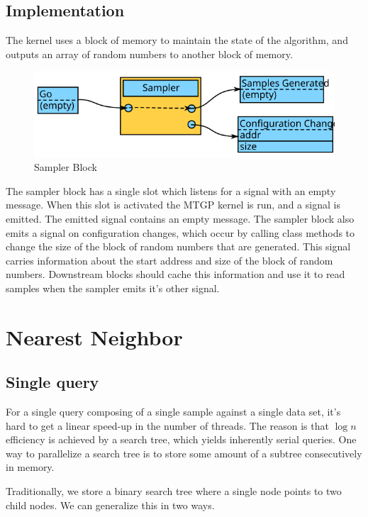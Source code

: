 \subsection{Implementation}

The kernel uses a block of memory to maintain the state of the algorithm, and outputs an array of random numbers to another block of memory. 

\begin{figure}[H]
\begin{centering}
    \includegraphics[scale=1]{fig/blocks/sampler}
    \caption{Sampler Block}
\end{centering}
\end{figure}

The sampler block has a single slot which listens for a signal with an empty message. When this slot is activated the MTGP kernel is run, and a signal is emitted. The emitted signal contains an empty message. The sampler block also emits a signal on configuration changes, which occur by calling class methods to change the size of the block of random numbers that are generated. This signal carries information about the start address and size of the block of random numbers. Downstream blocks should cache this information and use it to read samples when the sampler emits it's other signal.


\section{Nearest Neighbor}


\subsection{Single query}
For a single query composing of a single sample against a single data set, it's hard to get a linear speed-up in the number of threads. The reason is that $\log n$ efficiency is achieved by a search tree, which yields inherently serial queries. One way to parallelize a search tree is to store some amount of a subtree consecutively in memory. 

Traditionally, we store a binary search tree where a single node points to two child nodes. We can generalize this in two ways. 


